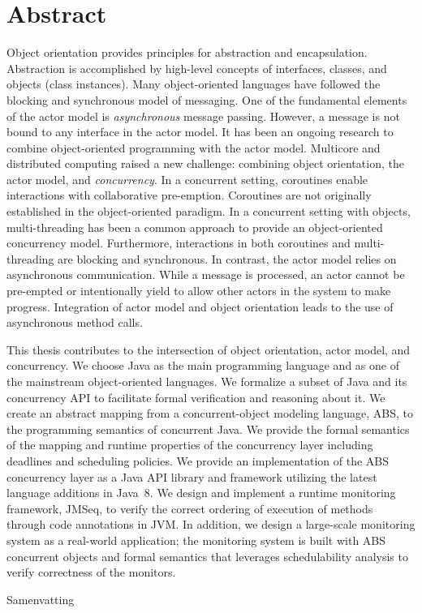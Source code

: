 %
\chapter*{Abstract}
\label{sec:abstract}
\vspace*{-10mm}

Object orientation provides principles for abstraction and encapsulation.
Abstraction is accomplished by high-level concepts of interfaces, classes, and objects (class instances).
Many object-oriented languages have followed the blocking and synchronous model of messaging. 
One of the fundamental elements of the actor model is \emph{asynchronous} message passing.
However, a message is not bound to any interface in the actor model.
It has been an ongoing research to combine object-oriented programming with the actor model.
Multicore and distributed computing raised a new challenge: combining object orientation, the actor model, and \emph{concurrency}.
In a concurrent setting, coroutines enable interactions with collaborative pre-emption.
Coroutines are not originally established in the object-oriented paradigm.
In a concurrent setting with objects, multi-threading has been a common approach to provide an object-oriented concurrency model.
Furthermore, interactions in both coroutines and multi-threading are blocking and synchronous.
In contrast, the actor model relies on asynchronous communication.
While a message is processed, an actor cannot be pre-empted or intentionally yield to allow other actors in the system to make progress.
Integration of actor model and object orientation leads to the use of asynchronous method calls.

This thesis contributes to the intersection of object orientation, actor model, and concurrency.
We choose Java as the main programming language and as one of the mainstream 
object-oriented languages. 
We formalize a subset of Java and its concurrency API to 
facilitate formal verification and reasoning about it.
We create an abstract mapping from a concurrent-object modeling language, 
ABS, to the programming semantics of concurrent Java. 
We provide the formal semantics of the mapping and runtime properties of 
the concurrency layer including deadlines and scheduling policies.
We provide an implementation of the ABS concurrency layer as a Java API library 
and framework utilizing the latest language additions 
in Java~8.
We design and implement a runtime monitoring framework, JMSeq, to verify the
correct ordering of execution of methods through code annotations in JVM. 
In addition, we design a large-scale monitoring system as a real-world 
application; the monitoring system is built with ABS concurrent objects 
and formal semantics that leverages schedulability 
analysis to verify correctness of the monitors.

\vspace*{20mm}

{Samenvatting}\label{sec:abstract-diff} \\

